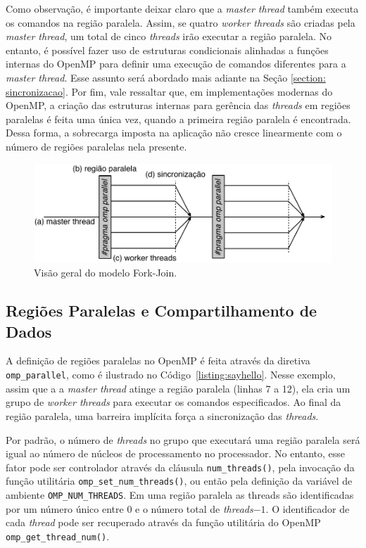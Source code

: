 \documentclass{SBCbookchapter}
\begin{document}
		Como observação, é importante deixar claro que a \textit{master
		thread} também executa os comandos na região paralela. Assim, se
		quatro \textit{worker threads} são criadas pela \textit{master
		thread}, um total de cinco \textit{threads} irão executar a região paralela.
		No entanto, é possível fazer uso de estruturas condicionais
		alinhadas a funções internas do OpenMP para definir uma execução de
		comandos diferentes para a \textit{master thread}. Esse assunto será
		abordado mais adiante na Seção \ref{section: sincronizacao}. Por
		fim, vale ressaltar que, em implementações modernas do OpenMP, a
		criação das estruturas internas para gerência das \textit{threads} em regiões
		paralelas é feita uma única vez, quando a primeira região paralela é
		encontrada. Dessa forma, a sobrecarga imposta na aplicação não
		cresce linearmente com o número de regiões paralelas nela presente.

			\begin{figure}[t]
				\centering
				\includegraphics[width=0.8\linewidth]{img/fork-join}
				\caption{Visão geral do modelo Fork-Join.}\label{fig:fork-join}
			\end{figure}

	\subsection{Regiões Paralelas e Compartilhamento de Dados}

		A definição de regiões paralelas no OpenMP é feita através da
		diretiva \texttt{omp\_parallel}, como é ilustrado no Código~\ref{listing:sayhello}.
		Nesse exemplo, assim que a a \textit{master thread}
		atinge a região paralela (linhas 7 a 12), ela cria um grupo de
		\textit{worker threads} para executar os comandos especificados. Ao
		final da região paralela, uma barreira implícita força a
		sincronização das \textit{threads}.
		
		Por padrão, o número de \textit{threads} no grupo que executará uma região
		paralela será igual ao número de núcleos de processamento no
		processador. No entanto, esse fator pode ser controlador através da
		cláusula \texttt{num\_threads()}, pela invocação da função
		utilitária \texttt{omp\_set\_num\_threads()}, ou então pela
		definição da variável de ambiente \texttt{OMP\_NUM\_THREADS}. Em uma região paralela
		as threads são identificadas por um número único entre $0$ e o número total de \textit{threads}$-1$.
		O identificador de cada \textit{thread} pode ser recuperado através da
		função utilitária do OpenMP \texttt{omp\_get\_thread\_num()}.
\end{document}
